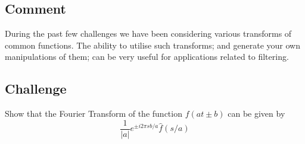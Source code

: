 \subsection*{Comment}
During the past few challenges we have been considering various transforms of common functions. The ability to utilise such transforms; and generate your own manipulations of them; can be very useful for applications related to filtering.

\subsection*{Challenge}
Show that the Fourier Transform of the function $f(at\pm b)$ can be given by
\begin{equation}
    \frac{1}{|a|} e^{\pm i 2 \pi s b/a} \hat{f}(s/a)
\end{equation}









\fi
